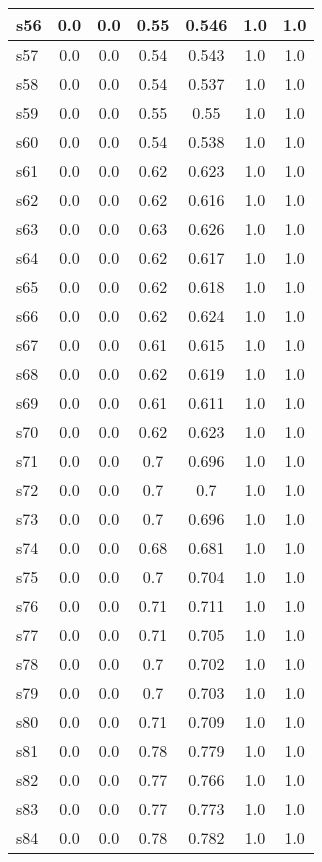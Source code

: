 \documentclass{article}
\begin{document}
\begin{tabular}{|l|c|c|c|c|c|c|}
\hline
s56 &0.0 & 0.0 & 0.55 & 0.546 & 1.0 & 1.0\\
\hline
s57 &0.0 & 0.0 & 0.54 & 0.543 & 1.0 & 1.0\\
\hline
s58 &0.0 & 0.0 & 0.54 & 0.537 & 1.0 & 1.0\\
\hline
s59 &0.0 & 0.0 & 0.55 & 0.55 & 1.0 & 1.0\\
\hline
s60 &0.0 & 0.0 & 0.54 & 0.538 & 1.0 & 1.0\\
\hline
s61 &0.0 & 0.0 & 0.62 & 0.623 & 1.0 & 1.0\\
\hline
s62 &0.0 & 0.0 & 0.62 & 0.616 & 1.0 & 1.0\\
\hline
s63 &0.0 & 0.0 & 0.63 & 0.626 & 1.0 & 1.0\\
\hline
s64 &0.0 & 0.0 & 0.62 & 0.617 & 1.0 & 1.0\\
\hline
s65 &0.0 & 0.0 & 0.62 & 0.618 & 1.0 & 1.0\\
\hline
s66 &0.0 & 0.0 & 0.62 & 0.624 & 1.0 & 1.0\\
\hline
s67 &0.0 & 0.0 & 0.61 & 0.615 & 1.0 & 1.0\\
\hline
s68 &0.0 & 0.0 & 0.62 & 0.619 & 1.0 & 1.0\\
\hline
s69 &0.0 & 0.0 & 0.61 & 0.611 & 1.0 & 1.0\\
\hline
s70 &0.0 & 0.0 & 0.62 & 0.623 & 1.0 & 1.0\\
\hline
s71 &0.0 & 0.0 & 0.7 & 0.696 & 1.0 & 1.0\\
\hline
s72 &0.0 & 0.0 & 0.7 & 0.7 & 1.0 & 1.0\\
\hline
s73 &0.0 & 0.0 & 0.7 & 0.696 & 1.0 & 1.0\\
\hline
s74 &0.0 & 0.0 & 0.68 & 0.681 & 1.0 & 1.0\\
\hline
s75 &0.0 & 0.0 & 0.7 & 0.704 & 1.0 & 1.0\\
\hline
s76 &0.0 & 0.0 & 0.71 & 0.711 & 1.0 & 1.0\\
\hline
s77 &0.0 & 0.0 & 0.71 & 0.705 & 1.0 & 1.0\\
\hline
s78 &0.0 & 0.0 & 0.7 & 0.702 & 1.0 & 1.0\\
\hline
s79 &0.0 & 0.0 & 0.7 & 0.703 & 1.0 & 1.0\\
\hline
s80 &0.0 & 0.0 & 0.71 & 0.709 & 1.0 & 1.0\\
\hline
s81 &0.0 & 0.0 & 0.78 & 0.779 & 1.0 & 1.0\\
\hline
s82 &0.0 & 0.0 & 0.77 & 0.766 & 1.0 & 1.0\\
\hline
s83 &0.0 & 0.0 & 0.77 & 0.773 & 1.0 & 1.0\\
\hline
s84 &0.0 & 0.0 & 0.78 & 0.782 & 1.0 & 1.0\\

\end{tabular}
\end{document}
